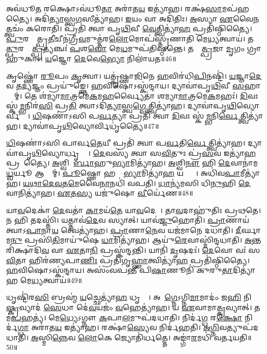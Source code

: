 𑌅𑌵॑𑌧𑍂\ul{𑌤}\ul{} 𑌰𑌕𑍍𑌷𑍋\-𑌽𑌵॑𑌧𑍂\ul{𑌤𑌾} 𑌅𑌰𑌾॑𑌤\ul{𑌯} 𑌇𑌤𑍍𑌯𑌾॑𑌹।
𑌰𑌕𑍍𑌷॑\ul{𑌸𑌾}𑌮𑌪॑𑌹𑌤𑍍𑌯𑍈।
𑌅𑌦𑌿॑\ul{𑌤𑍍𑌯𑌾}𑌸𑍍𑌤𑍍𑌵\ul{𑌗}𑌸𑍀𑌤𑍍𑌯𑌾॑𑌹।
\ul{𑌇}𑌯𑌂 𑌵𑌾 𑌅𑌦𑌿॑𑌤𑌿𑌃।
\ul{𑌅}𑌸𑍍𑌯𑌾 \ul{𑌏}𑌵𑍈\ul{𑌨}𑌤𑍍𑌤𑍍𑌵𑌚𑌂॑ 𑌕𑌰𑍋𑌤𑌿।
𑌪𑍍𑌰𑌤𑌿॑ 𑌤𑍍𑌵𑌾 𑌪𑍃\ul{𑌥𑌿}𑌵𑍀 \ul{𑌵𑍇}𑌤𑍍𑌤𑍍𑌵𑌿𑌤𑍍𑌯𑌾॑\ul{𑌹} 𑌪𑍍𑌰𑌤𑌿॑\-𑌷𑍍𑌠𑌿𑌤𑍍𑌯𑍈।
\ul{𑌪𑍁}𑌰𑌸𑍍𑌤𑌾᳚𑌤𑍍𑌪𑍍𑌰\ul{𑌤𑍀}𑌚𑍀𑌨॑𑌗𑍍𑌰𑍀\ul{𑌵}𑌮𑍁𑌤𑍍𑌤॑𑌰\ul{𑌲𑍋}𑌮𑍋𑌪॑𑌸𑍍𑌤𑍃𑌣𑌾𑌤𑌿 𑌮𑍇\ul{𑌧𑍍𑌯}𑌤𑍍𑌵𑌾𑌯॑।
𑌤𑌸𑍍𑌮𑌾᳚\ul{𑌤𑍍𑌪𑍁}𑌰𑌸𑍍𑌤𑌾᳚\ul{𑌤𑍍𑌪𑍍𑌰}𑌤𑍍𑌯𑌞𑍍𑌚𑌃॑ \ul{𑌪}𑌶\ul{𑌵𑍋} 𑌮𑍇\ul{𑌧}𑌮𑍁𑌪॑𑌤𑌿𑌷𑍍𑌠𑌨𑍍𑌤𑍇।
𑌤𑌸𑍍𑌮𑌾᳚\ul{𑌤𑍍𑌪𑍍𑌰}𑌜𑌾 \ul{𑌮𑍃}𑌗𑌂 𑌗𑍍𑌰𑌾𑌹𑍁॑𑌕𑌾𑌃।
\ul{𑌯}𑌜𑍍𑌞𑍋 \ul{𑌦𑍇}𑌵𑍇\ul{𑌭𑍍𑌯𑍋} 𑌨𑌿𑌲𑌾॑𑌯𑌤॥46॥

𑌕𑍃𑌷𑍍𑌣𑍋॑ \ul{𑌰𑍂}𑌪𑌂 \ul{𑌕𑍃}𑌤𑍍𑌵𑌾।
𑌯𑌤𑍍𑌕𑍃॑𑌷𑍍𑌣𑌾\ul{𑌜𑌿}𑌨𑍇 \ul{𑌹}𑌵𑌿𑌰॑𑌧𑌿\ul{𑌪𑌿}𑌨𑌷𑍍𑌟𑌿॑।
\ul{𑌯}𑌜𑍍𑌞𑌾\ul{𑌦𑍇}𑌵 𑌤\ul{𑌦𑍍𑌯}𑌜𑍍𑌞𑌂 𑌪𑍍𑌰𑌯𑍁॑𑌙𑍍𑌕𑍍𑌤𑍇।
\ul{𑌹}𑌵𑌿𑌷𑍋\-𑌽𑌸𑍍𑌕॑𑌨𑍍𑌦𑌾𑌯।
𑌦𑍍𑌯𑌾𑌵𑌾॑𑌪𑍃\ul{𑌥𑌿}𑌵𑍀 \ul{𑌸}𑌹𑌾𑌸𑍍𑌤𑌾᳚𑌮𑍍।
𑌤𑍇 𑌶॑𑌮𑍍𑌯𑌾\ul{𑌮𑌾}𑌤𑍍𑌰𑌮𑍇\ul{𑌕}𑌮\ul{𑌹}𑌰𑍍𑌵𑍍𑌯𑍈𑌤𑌾॑ 𑌶𑌮𑍍𑌯𑌾\ul{𑌮𑌾}𑌤𑍍𑌰𑌮𑍇\ul{𑌕}𑌮𑌹𑌃॑।
\ul{𑌦𑌿}𑌵𑌃 𑌸𑍍𑌕॑\ul{𑌮𑍍𑌭}𑌨𑌿𑌰॑\ul{𑌸𑌿} 𑌪𑍍𑌰\ul{𑌤𑌿} 𑌤𑍍𑌵𑌾\-𑌽𑌦𑌿॑\ul{𑌤𑍍𑌯𑌾}𑌸𑍍𑌤𑍍𑌵\ul{𑌗𑍍𑌵𑍇}𑌤𑍍𑌤𑍍𑌵𑌿𑌤𑍍𑌯𑌾॑𑌹।
𑌦𑍍𑌯𑌾𑌵𑌾॑𑌪𑍃\ul{𑌥𑌿}𑌵𑍍𑌯𑍋𑌰𑍍𑌵𑍀𑌤𑍍𑌯𑍈᳚।
\ul{𑌧𑌿}𑌷𑌣𑌾॑𑌽𑌸𑌿 𑌪\ul{𑌰𑍍𑌵}𑌤𑍍𑌯𑌾 𑌪𑍍𑌰𑌤𑌿॑ 𑌤𑍍𑌵𑌾 \ul{𑌦𑌿}𑌵𑌃 𑌸𑍍𑌕॑\ul{𑌮𑍍𑌭}𑌨𑌿\ul{𑌰𑍍𑌵𑍇}𑌤𑍍𑌤𑍍𑌵𑌿𑌤𑍍𑌯𑌾॑𑌹।
𑌦𑍍𑌯𑌾𑌵𑌾॑𑌪𑍃\ul{𑌥𑌿}𑌵𑍍𑌯𑍋𑌰𑍍𑌵𑌿𑌧𑍃॑𑌤𑍍𑌯𑍈॥47॥

\ul{𑌧𑌿}𑌷𑌣𑌾॑𑌽𑌸𑌿 𑌪𑌾𑌰𑍍𑌵\ul{𑌤𑍇}𑌯𑍀 𑌪𑍍𑌰𑌤𑌿॑ 𑌤𑍍𑌵𑌾 𑌪\ul{𑌰𑍍𑌵}𑌤𑌿\ul{𑌰𑍍𑌵𑍇}𑌤𑍍𑌤𑍍𑌵𑌿𑌤𑍍𑌯𑌾॑𑌹।
𑌦𑍍𑌯𑌾𑌵𑌾॑𑌪𑍃\ul{𑌥𑌿}𑌵𑍍𑌯𑍋𑌰𑍍𑌧𑍃𑌤𑍍𑌯𑍈᳚।
\ul{𑌦𑍇}𑌵𑌸𑍍𑌯॑ 𑌤𑍍𑌵𑌾 𑌸\ul{𑌵𑌿}𑌤𑍁𑌃 𑌪𑍍𑌰॑\ul{𑌸}𑌵 𑌇𑌤𑍍𑌯𑌾॑\ul{𑌹} 𑌪𑍍𑌰𑌸𑍂᳚𑌤𑍍𑌯𑍈।
\ul{𑌅}𑌶𑍍𑌵𑌿𑌨𑍋᳚\ul{𑌰𑍍𑌬𑌾}𑌹𑍁\ul{𑌭𑍍𑌯𑌾}𑌮𑌿𑌤𑍍𑌯𑌾॑𑌹।
\ul{𑌅}𑌶𑍍𑌵𑌿\ul{𑌨𑍗} 𑌹𑌿 \ul{𑌦𑍇}𑌵𑌾𑌨𑌾॑𑌮\ul{𑌧𑍍𑌵}𑌰𑍍𑌯𑍂 𑌆𑌸𑍍𑌤𑌾᳚𑌮𑍍।
\ul{𑌪𑍂}𑌷𑍍𑌣𑍋 𑌹𑌸𑍍𑌤𑌾᳚\ul{𑌭𑍍𑌯𑌾}𑌮𑌿𑌤𑍍𑌯𑌾॑\ul{𑌹} 𑌯𑌤𑍍𑌤𑍍𑌯𑍈᳚।
𑌅𑌧𑌿॑𑌵\ul{𑌪𑌾}𑌮𑍀𑌤𑍍𑌯𑌾॑𑌹।
\ul{𑌯}\ul{𑌥𑌾}\ul{𑌦𑍇}\ul{𑌵}𑌤\ul{𑌮𑍇}𑌵𑍈\ul{𑌨𑌾}𑌨𑌧𑌿॑ 𑌵𑌪𑌤𑌿।
\ul{𑌧𑌾}𑌨𑍍𑌯॑𑌮𑌸𑌿 𑌧𑌿\ul{𑌨𑍁}𑌹𑌿 \ul{𑌦𑍇}𑌵𑌾𑌨𑌿𑌤𑍍𑌯𑌾॑𑌹।
\ul{𑌏}𑌤\ul{𑌸𑍍𑌯} 𑌯𑌜𑍁॑𑌷𑍋 \ul{𑌵𑍀}𑌰𑍍𑌯𑍇॑𑌣॥48॥

𑌯𑌾\ul{𑌵}𑌦𑍇𑌕𑌾॑ \ul{𑌦𑍇}𑌵𑌤𑌾॑ \ul{𑌕𑌾}𑌮𑌯॑\ul{𑌤𑍇} 𑌯𑌾\ul{𑌵}𑌦𑍇𑌕𑌾᳚।
𑌤𑌾\ul{𑌵}𑌦𑌾𑌹𑍁॑𑌤𑌿𑌃 𑌪𑍍𑌰𑌥𑌤𑍇।
𑌨 𑌹𑌿 𑌤𑌦𑌸𑍍𑌤𑌿॑।
𑌯𑌤𑍍𑌤𑌾𑌵॑\ul{𑌦𑍇}𑌵 𑌸𑍍𑌯𑌾𑌤𑍍।
𑌯𑌾𑌵॑\ul{𑌜𑍍𑌜𑍁}𑌹𑍋𑌤𑌿॑।
\ul{𑌪𑍍𑌰𑌾}𑌣𑌾𑌯॑ 𑌤𑍍𑌵𑌾\-𑌽\ul{𑌪𑌾}𑌨𑌾\ul{𑌯} 𑌤𑍍𑌵𑍇𑌤𑍍𑌯𑌾॑𑌹।
\ul{𑌪𑍍𑌰𑌾}𑌣𑌾\ul{𑌨𑍇}𑌵 𑌯𑌜॑𑌮𑌾𑌨𑍇 𑌦𑌧𑌾𑌤𑌿।
\ul{𑌦𑍀}𑌰𑍍𑌘𑌾𑌮\ul{𑌨𑍁} 𑌪𑍍𑌰𑌸𑌿॑\ul{𑌤𑌿}𑌮𑌾𑌯𑍁॑𑌷𑍇 \ul{𑌧𑌾}𑌮𑌿𑌤𑍍𑌯𑌾॑𑌹।
𑌆𑌯𑍁॑\ul{𑌰𑍇}𑌵𑌾𑌸𑍍𑌮𑌿॑𑌨𑍍𑌦𑌧𑌾𑌤𑌿।
\ul{𑌅}𑌨𑍍𑌤𑌰𑌿॑𑌕𑍍𑌷𑌾𑌦𑌿\ul{𑌵} 𑌵𑌾 \ul{𑌏}𑌤𑌾\ul{𑌨𑌿} 𑌪𑍍𑌰𑌸𑍍𑌕॑𑌨𑍍𑌦𑌨𑍍𑌤𑌿।
𑌯𑌾𑌨𑌿॑ \ul{𑌦𑍃}𑌷𑌦𑌃॑।
\ul{𑌦𑍇}𑌵𑍋 𑌵𑌃॑ 𑌸\ul{𑌵𑌿}𑌤𑌾 𑌹𑌿𑌰॑𑌣𑍍𑌯𑌪𑌾\ul{𑌣𑌿𑌃} 𑌪𑍍𑌰𑌤𑌿॑\-𑌗𑍃\ul{𑌹𑍍𑌣𑌾}𑌤𑍍𑌵𑌿𑌤𑍍𑌯𑌾॑\ul{𑌹} 𑌪𑍍𑌰𑌤𑌿॑\-𑌷𑍍𑌠𑌿𑌤𑍍𑌯𑍈।
\ul{𑌹}𑌵𑌿𑌷𑍋\-𑌽𑌸𑍍𑌕॑𑌨𑍍𑌦𑌾𑌯।
𑌅𑌸𑌂॑𑌵𑌪𑌨𑍍𑌤𑍀 𑌪𑌿\ul{𑌷𑌾}𑌣𑍂𑌨𑌿॑ 𑌕𑍁𑌰𑍁\ul{𑌤𑌾}𑌦𑌿𑌤𑍍𑌯𑌾॑𑌹 𑌮𑍇\ul{𑌧𑍍𑌯}𑌤𑍍𑌵𑌾𑌯॑॥49॥\anuvakamend[𑌨𑌿𑌲𑌾॑𑌯\ul{𑌤} 𑌵𑌿𑌧𑍃॑𑌤𑍍𑌯𑍈 \ul{𑌵𑍀}𑌰𑍍𑌯𑍇॑𑌣 𑌸𑍍𑌕𑌨𑍍𑌦𑌨𑍍𑌤𑌿 \ul{𑌚}𑌤𑍍𑌵𑌾𑌰𑌿॑ 𑌚]

𑌧𑍃𑌷𑍍𑌟𑌿॑𑌰\ul{𑌸𑌿} 𑌬𑍍𑌰𑌹𑍍𑌮॑ \ul{𑌯}𑌚𑍍𑌛𑍇𑌤𑍍𑌯𑌾॑\ul{𑌹} 𑌧𑍃𑌤𑍍𑌯𑍈᳚।
𑌅𑌪𑌾᳚\ul{𑌗𑍍𑌨𑍇}\-𑌽𑌗𑍍𑌨𑌿\ul{𑌮𑌾}𑌮𑌾𑌦𑌂॑ 𑌜\ul{𑌹𑌿} 𑌨𑌿\ul{𑌷𑍍𑌕𑍍𑌰}𑌵𑍍𑌯𑌾𑌦॑ \ul{𑌸𑍇}𑌧𑌾 𑌦𑍇॑\ul{𑌵}𑌯𑌜𑌂॑ \ul{𑌵}𑌹𑍇𑌤𑍍𑌯𑌾॑𑌹।
𑌯 \ul{𑌏}𑌵𑌾𑌮𑌾\ul{𑌤𑍍𑌕𑍍𑌰}𑌵𑍍𑌯𑌾𑌤𑍍।
𑌤𑌮॑\ul{𑌪}𑌹𑌤𑍍𑌯॑।
𑌮𑍇\ul{𑌧𑍍𑌯𑍇}\-𑌽𑌗𑍍𑌨𑍗 \ul{𑌕}𑌪𑌾\ul{𑌲}𑌮𑍁𑌪॑𑌦𑌧𑌾𑌤𑌿।
𑌨𑌿𑌰𑍍𑌦॑\ul{𑌗𑍍𑌧}\ul{} 𑌰\ul{𑌕𑍍𑌷𑍋} 𑌨𑌿𑌰𑍍𑌦॑\ul{𑌗𑍍𑌧𑌾} 𑌅𑌰𑌾॑𑌤\ul{𑌯} 𑌇𑌤𑍍𑌯𑌾॑𑌹।
𑌰𑌕𑍍𑌷𑌾॑\ul{𑌸𑍍𑌯𑍇}𑌵 𑌨𑌿𑌰𑍍𑌦॑𑌹𑌤𑌿।
\ul{𑌅}\ul{𑌗𑍍𑌨𑌿}𑌵𑌤𑍍𑌯𑍁𑌪॑𑌦𑌧𑌾𑌤𑌿।
\ul{𑌅}𑌸𑍍𑌮𑌿\ul{𑌨𑍍𑌨𑍇}𑌵 \ul{𑌲𑍋}𑌕𑍇 𑌜𑍍𑌯𑍋𑌤𑌿॑𑌰𑍍𑌧𑌤𑍍𑌤𑍇।
𑌅𑌙𑍍𑌗𑌾॑\ul{𑌰}𑌮𑌧𑌿॑ 𑌵𑌰𑍍𑌤𑌯𑌤𑌿॥50॥

